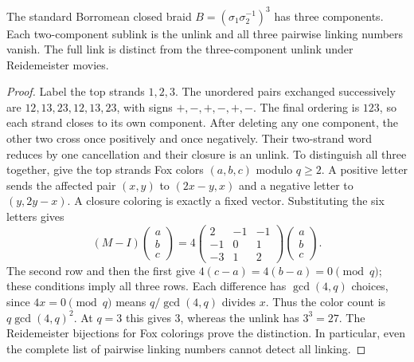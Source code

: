\begin{proposition}
The standard Borromean closed braid $B=(\sigma_1\sigma_2^{-1})^3$ has
three components. Each two-component sublink is the unlink and all three
pairwise linking numbers vanish. The full link is distinct from the
three-component unlink under Reidemeister movies.
\end{proposition}
\begin{proof}
Label the top strands $1,2,3$. The unordered pairs exchanged successively
are $12,13,23,12,13,23$, with signs $+,-,+,-,+,-$. The final ordering
is $123$, so each strand closes to its own component. After deleting any
one component, the other two cross once positively and once negatively.
Their two-strand word reduces by one cancellation and their closure is an
unlink. To distinguish all three together, give the top strands Fox colors
$(a,b,c)$ modulo $q\ge2$. A positive letter sends the affected pair
$(x,y)$ to $(2x-y,x)$ and a negative letter to $(y,2y-x)$. A closure
coloring is exactly a fixed vector. Substituting the six letters gives
\[
 (M-I)\begin{pmatrix}a\\b\\c\end{pmatrix}
 =4\begin{pmatrix}2&-1&-1\\-1&0&1\\-3&1&2\end{pmatrix}
   \begin{pmatrix}a\\b\\c\end{pmatrix}.
\]
The second row and then the first give $4(c-a)=4(b-a)=0\pmod q$;
these conditions imply all three rows. Each difference has
$\gcd(4,q)$ choices, since $4x=0\pmod q$ means
$q/\gcd(4,q)$ divides $x$. Thus the color count is
$q\gcd(4,q)^2$. At $q=3$ this gives $3$, whereas the unlink has
$3^3=27$. The Reidemeister bijections for Fox colorings prove the
distinction. In particular, even the complete list of pairwise linking
numbers cannot detect all linking.
\end{proof}


